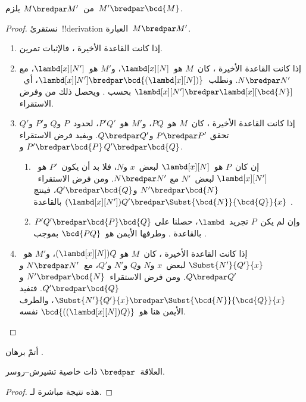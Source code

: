 \documentclass[../../../include/open-logic-section]{subfiles}
\begin{document}
\begin{lem}
  من~$M \bredpar M'$ يلزم~$M' \bredpar \bcd{M}$.
\end{lem}
\begin{proof}
  نستقرئ~!!{derivation} العبارة~$M \bredpar M'$.
  \begin{enumerate}
    \item إذا كانت القاعدة الأخيرة ، فالإثبات تمرين.
    \item إذا كانت القاعدة الأخيرة ، كان~$M$
      هو~$\lambd[x][N]$، و$M'$ هو~$\lambd[x][N']$، مع
      $N \bredpar N'$. ونطلب~$\lambd[x][N'] \bredpar
      \bcd{(\lambd[x][N])}$، أي~$\lambd[x][N'] \bredpar
      \lambd[x][\bcd{N}]$ بحسب .
      ويحصل ذلك من  وفرض الاستقراء.
    \item إذا كانت القاعدة الأخيرة ، كان~$M$ هو~$PQ$،
      و$M'$ هو~$P'Q'$، لحدود~$P$ و$Q$ و$P'$ و$Q'$ تحقق
      $P \bredpar P'$ و$Q \bredpar Q'$. ويفيد فرض الاستقراء
      $P' \bredpar \bcd{P}$ و$Q' \bredpar \bcd{Q}$.
      \begin{enumerate}
        \item إن كان~$P$ هو~$\lambd[x][N]$ لبعض~$x$ و$N$،
          فلا بد أن يكون~$P'$ هو~$\lambd[x][N']$ لبعض~$N'$ مع
          $N \bredpar N'$. ومن فرض الاستقراء~$N' \bredpar \bcd{N}$
          و$Q' \bredpar \bcd{Q}$، فينتج
          $(\lambd[x][N'])Q' \bredpar
          \Subst{\bcd{N}}{\bcd{Q}}{x}$ بالقاعدة .
        \item وإن لم يكن~$P$ تجريد~$\lambd$، حصلنا على
          $P'Q' \bredpar \bcd{P}\bcd{Q}$ بالقاعدة .
          وطرفها الأيمن هو~$\bcd{PQ}$ بموجب .
      \end{enumerate}
    \item إذا كانت القاعدة الأخيرة ، كان~$M$ هو
      $(\lambd[x][N])Q$، و$M'$ هو~$\Subst{N'}{Q'}{x}$ لبعض~$x$ و$N$
      و$Q$ و$N'$ و$Q'$، مع~$N \bredpar N'$ و$Q \bredpar Q'$.
      ومن فرض الاستقراء~$N' \bredpar \bcd{N}$ و
      $Q' \bredpar \bcd{Q}$. فتفيد 
      $\Subst{N'}{Q'}{x} \bredpar \Subst{\bcd{N}}{\bcd{Q}}{x}$،
      والطرف الأيمن هنا هو~$\bcd{((\lambd[x][N])Q)}$ نفسه.
  \end{enumerate}
\end{proof}

\begin{prob}
  أتمّ برهان .
\end{prob}

\begin{thm}
  العلاقة~$\bredpar$ ذات خاصية تشيرش--روسر.
\end{thm}

\begin{proof}
  هذه نتيجة مباشرة لـ.
\end{proof}
\end{document}
